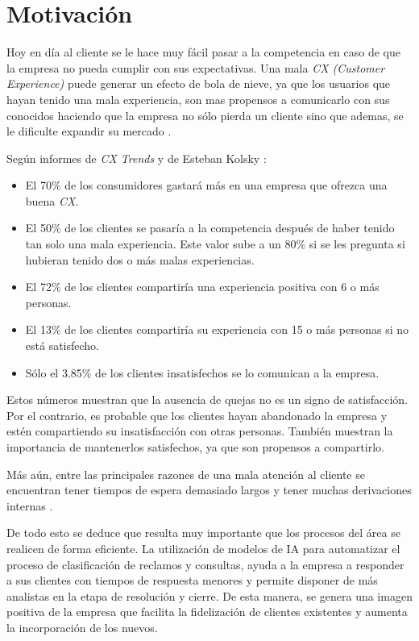 
\section{Motivación}

Hoy en día al cliente se le hace muy fácil pasar a la competencia en caso de que la empresa no pueda cumplir con sus expectativas. Una mala \textit{CX (Customer Experience)} puede generar un efecto de bola de nieve, ya que los usuarios que hayan tenido una mala experiencia, son mas propensos a comunicarlo con sus conocidos haciendo que la empresa no sólo pierda un cliente sino que ademas, se le dificulte expandir su mercado \citep{WEBSITE:9}.

Según informes de \textit{CX Trends} \citep{cxtrends}\citep{WEBSITE:4}\citep{WEBSITE:10} y de Esteban Kolsky \citep{WEBSITE:11}:

\begin{itemize}
\item El 70\% de los consumidores gastará más en una empresa que ofrezca una buena \textit{CX}.
\item El 50\% de los clientes se pasaría a la competencia después de haber tenido tan solo una mala experiencia. Este valor sube a un 80\% si se les pregunta si hubieran tenido dos o más malas experiencias.
\item El 72\% de los clientes compartiría una experiencia positiva con 6 o más personas.
\item El 13\% de los clientes compartiría su experiencia con 15 o más personas si no está satisfecho.
\item Sólo el 3.85\% de los clientes insatisfechos se lo comunican a la empresa.
\end{itemize}

Estos números muestran que la ausencia de quejas no es un signo de satisfacción. Por el contrario, es probable que los clientes hayan abandonado la empresa y estén compartiendo su insatisfacción con otras personas. También muestran la importancia de mantenerlos satisfechos, ya que son propensos a compartirlo.

Más aún, entre las principales razones de una mala atención al cliente se encuentran tener tiempos de espera demasiado largos \citep{WEBSITE:12} y tener muchas derivaciones internas \citep{WEBSITE:13}.

De todo esto se deduce que resulta muy importante que los procesos del área se realicen de forma eficiente. La utilización de modelos de IA para automatizar el proceso de clasificación de reclamos y consultas, ayuda a la empresa a responder a sus clientes con tiempos de respuesta menores y permite disponer de más analistas en la etapa de resolución y cierre. De esta manera, se genera una imagen positiva de la empresa que facilita la fidelización de clientes existentes y aumenta la incorporación de los nuevos.

